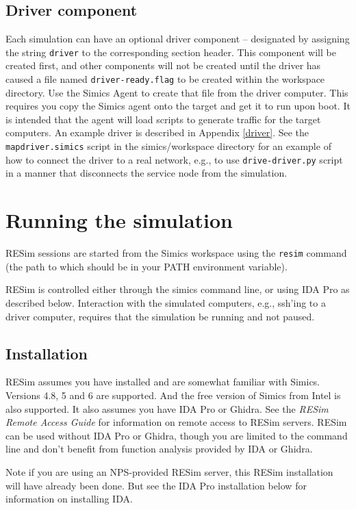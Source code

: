 \documentclass[titlepage]{article}
\begin{document}
\subsection{Driver component}
Each simulation can have an optional driver component -- designated by assigning the string {\tt driver} to the corresponding
section header.  This component will be created first, and other components will not be created until the driver has
caused a file named {\tt driver-ready.flag} to be created within the workspace directory.  Use the Simics Agent to 
create that file from the driver computer.  This requires you copy the Simics agent onto the target and get it to run
upon boot.  It is intended that the agent will load scripts to generate traffic for the target computers.  
An example driver is described in Appendix \ref{driver}.   
See the {\tt mapdriver.simics} script in the simics/workspace directory for an example of how to connect the driver to a real network,
e.g., to use {\tt drive-driver.py} script in a manner that disconnects the service node from the simulation.

\section{Running the simulation}
\label{running}
RESim sessions are started from the Simics workspace using the {\tt resim} command (the path to which should be in your PATH
environment variable).

RESim is controlled either through the simics command line, or using IDA Pro as described below.  Interaction with the simulated
computers, e.g., ssh'ing to a driver computer, requires that the simulation be running and not paused.

\subsection{Installation}
\label{installation}
RESim assumes you have installed and are somewhat familiar with Simics.  Versions 4.8, 5 and 6 are supported.
And the free version of Simics from Intel is also supported.
It also assumes you have IDA Pro or Ghidra. See the \textit{RESim Remote Access Guide} for information on remote access to RESim
servers.  RESim can be used without IDA Pro or Ghidra, though you are limited to the command line and don't benefit from
function analysis provided by IDA or Ghidra.

Note if you are using an NPS-provided RESim server, this RESim installation will have already been done.  But
see the IDA Pro installation below for information on installing IDA. 
\end{document}
